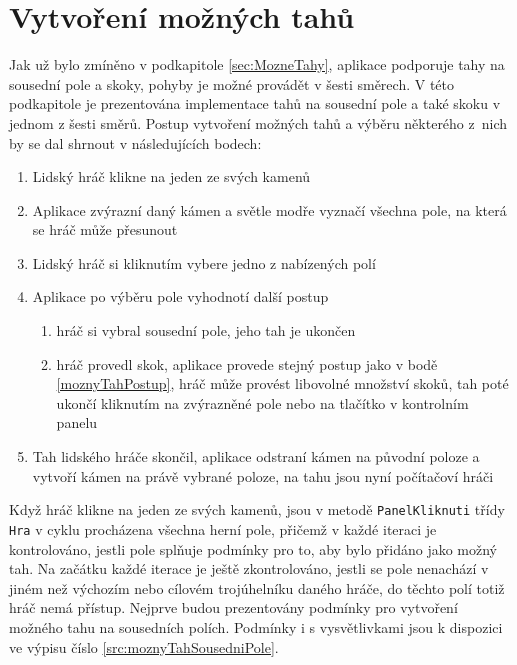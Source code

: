 \section{Vytvoření možných tahů}
\label{sec:VytvoreniMoznychTahu}
Jak už bylo zmíněno v podkapitole \ref{sec:MozneTahy}, aplikace podporuje tahy na sousední pole a skoky, pohyby je možné provádět v šesti směrech. V této podkapitole je prezentována implementace tahů na sousední pole a také skoku v jednom z šesti směrů. Postup vytvoření možných tahů a výběru některého z~nich by se dal shrnout v následujících bodech:
\begin{enumerate}
	\item Lidský hráč klikne na jeden ze svých kamenů
\item\label{moznyTahPostup} Aplikace zvýrazní daný kámen a světle modře vyznačí všechna pole, na která se hráč může přesunout
\item Lidský hráč si kliknutím vybere jedno z nabízených polí
	\item Aplikace po výběru pole vyhodnotí další postup
	\begin{enumerate}
		\item hráč si vybral sousední pole, jeho tah je ukončen
		\item hráč provedl skok, aplikace provede stejný postup jako v bodě \ref{moznyTahPostup}, hráč může provést libovolné množství skoků, tah poté ukončí kliknutím na zvýrazněné pole nebo na tlačítko v kontrolním panelu
	\end{enumerate}
	\item Tah lidského hráče skončil, aplikace odstraní kámen na původní poloze a vytvoří kámen na právě vybrané poloze, na tahu jsou nyní počítačoví hráči
\end{enumerate}

Když hráč klikne na jeden ze svých kamenů, jsou v metodě \lstinline$PanelKliknuti$ třídy \lstinline$Hra$ v cyklu procházena všechna herní pole, přičemž v každé iteraci je kontrolováno, jestli pole splňuje podmínky pro to, aby bylo přidáno jako možný tah. Na začátku každé iterace je ještě zkontrolováno, jestli se pole nenachází v jiném než výchozím nebo cílovém trojúhelníku daného hráče, do těchto polí totiž hráč nemá přístup. Nejprve budou prezentovány podmínky pro vytvoření možného tahu na sousedních polích. Podmínky i s vysvětlivkami jsou k dispozici ve výpisu číslo \ref{src:moznyTahSousedniPole}.


